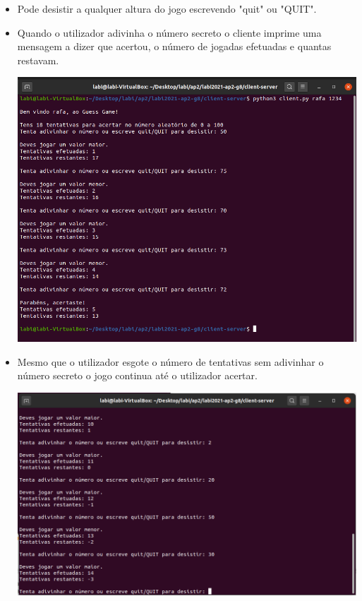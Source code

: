 \documentclass{report}
\begin{document}
\begin{itemize}
    
    \item Pode desistir a qualquer altura do jogo escrevendo "quit" ou "QUIT".
    \item Quando o utilizador adivinha o número secreto o cliente imprime uma mensagem a dizer que acertou, o número de jogadas efetuadas e quantas restavam.
        \begin{center}
            \includegraphics[scale = 0.57]{Imagens/cliente.png}
        \end{center}
    \item Mesmo que o utilizador esgote o número de tentativas sem adivinhar o número secreto o jogo continua até o utilizador acertar.
        \begin{center}
            \includegraphics[scale = 0.54]{Imagens/cliente1.png}
        \end{center}

\end{itemize}
\end{document}
